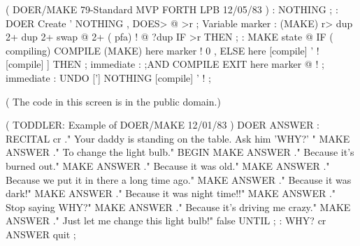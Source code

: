 \vfill
\begin{Screen}
( DOER/MAKE   79-Standard  MVP FORTH             LPB 12/05/83 )
: NOTHING ;
: DOER   Create  ' NOTHING  ,  DOES> @ >r ;
Variable marker
: (MAKE)  r>  dup 2+  dup 2+  swap @  2+ ( pfa) !
   @ ?dup IF >r THEN ;
: MAKE   state @ IF ( compiling)
   COMPILE (MAKE)  here marker !  0 ,
   ELSE  here  [compile] ' !
    [compile] ]  THEN ;   immediate
: ;AND   COMPILE EXIT  here marker @ ! ;   immediate
: UNDO   ['] NOTHING  [compile] ' ! ;


( The code in this screen is in the public domain.)

\end{Screen}
\vfill
\begin{Screen}
( TODDLER: Example of DOER/MAKE                      12/01/83 )
DOER ANSWER
: RECITAL
  cr ." Your daddy is standing on the table.  Ask him 'WHY?' "
  MAKE ANSWER  ." To change the light bulb."
  BEGIN
  MAKE ANSWER  ." Because it's burned out."
  MAKE ANSWER  ." Because it was old."
  MAKE ANSWER  ." Because we put it in there a long time ago."
  MAKE ANSWER  ." Because it was dark!"
  MAKE ANSWER  ." Because it was night time!!"
  MAKE ANSWER  ." Stop saying WHY?"
  MAKE ANSWER  ." Because it's driving me crazy."
  MAKE ANSWER  ." Just let me change this light bulb!"
  false UNTIL ;
: WHY?   cr  ANSWER  quit ;
\end{Screen}
\vfill
